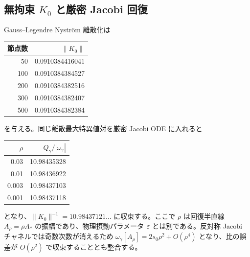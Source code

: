 \subsection{\texorpdfstring{無拘束 $K_0$ と厳密 Jacobi 回復}{無拘束 K0 と厳密 Jacobi 回復}}
Gauss--Legendre Nystr\"om 離散化は
\begin{center}
\begin{tabular}{rr}
\toprule
節点数 & $\|K_0\|$\\
\midrule
50&0.0910384416041\\
100&0.0910384384527\\
200&0.0910384382516\\
300&0.0910384382407\\
500&0.0910384382384\\
\bottomrule
\end{tabular}
\end{center}
を与える。同じ離散最大特異値対を厳密 Jacobi ODE に入れると
\begin{center}
\begin{tabular}{rr}
\toprule
$\rho$ & $Q_\gamma/|\omega_\gamma|$\\
\midrule
0.03&10.98435328\\
0.01&10.98436922\\
0.003&10.98437103\\
0.001&10.98437118\\
\bottomrule
\end{tabular}
\end{center}
となり、$\|K_0\|^{-1}=10.98437121\ldots$ に収束する。ここで $\rho$ は回復半直線 $A_\rho=\rho A_*$ の振幅であり、物理摂動パラメータ $\varepsilon$ とは別である。反対称 Jacobi チャネルでは奇数次数が消えるため $\omega_\gamma[A_\rho]=2s_0\rho^2+O(\rho^4)$ となり、比の誤差が $O(\rho^2)$ で収束することとも整合する。

